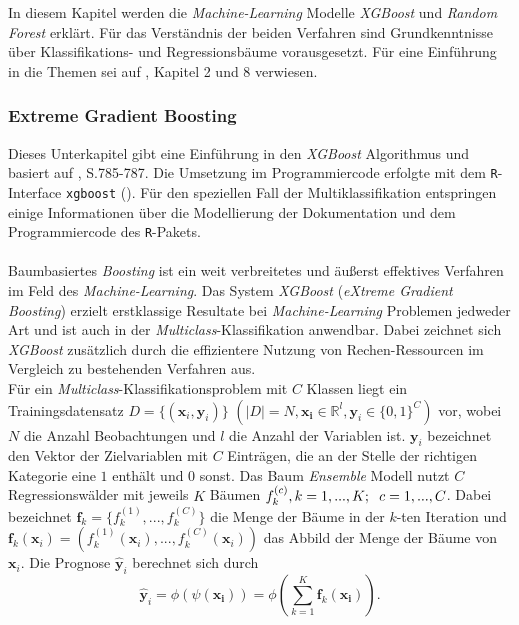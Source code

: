 \documentclass[a4paper,11pt]{article}
\begin{document}
In diesem Kapitel werden die \textit{Machine-Learning} Modelle \textit{XGBoost} und \textit{Random Forest} erklärt. Für das Verständnis der beiden Verfahren sind Grundkenntnisse über Klassifikations- und Regressionsbäume vorausgesetzt. Für eine Einführung in die Themen sei auf \cite{CART}, Kapitel 2 und 8 verwiesen.



\subsubsection{Extreme Gradient Boosting}\label{kap:XG}

Dieses Unterkapitel gibt eine Einführung in den \textit{XGBoost} Algorithmus und basiert auf \cite{XGBoost}, S.785-787. Die Umsetzung im Programmiercode erfolgte mit dem \texttt{R}-Interface \texttt{xgboost} (\cite{XGBoostR}). Für den speziellen Fall der Multiklassifikation entspringen einige Informationen über die Modellierung der Dokumentation und dem Programmiercode des \texttt{R}-Pakets.\\
\\
Baumbasiertes \textit{Boosting} ist ein weit verbreitetes und äußerst effektives Verfahren im Feld des \textit{Machine-Learning}. Das System \textit{XGBoost} (\textit{eXtreme Gradient Boosting}) erzielt erstklassige Resultate bei \textit{Machine-Learning} Problemen jedweder Art und ist auch in der \textit{Multi\-class}-Klassifikation anwendbar. Dabei zeichnet sich \textit{XGBoost} zusätzlich durch die effizientere Nutzung von Rechen-Ressourcen im Vergleich zu bestehenden Verfahren aus. \\
Für ein \textit{Multiclass}-Klassifikationsproblem mit $C$ Klassen liegt ein Trainingsdatensatz $D = \{(\bm{x}_i, \bm{y}_i) \}$ $(|D| = N, \bm{x_i} \in \mathbb{R}^l, \bm{y}_i \in \{0,1\}^C)$ vor, wobei $N$ die Anzahl Beobachtungen und $l$ die Anzahl der Variablen ist. $\bm{y}_i$ bezeichnet den Vektor der Zielvariablen mit $C$ Einträgen, die an der Stelle der richtigen Kategorie eine $1$ enthält und $0$ sonst. Das Baum \textit{Ensemble} Modell nutzt $C$ Regressionswälder mit jeweils $K$ Bäumen $f_k^{(c)}, k=1,...,K ;\hspace{0.2cm} c = 1,...,C$. Dabei bezeichnet $\bm{f}_k = \{f_k^{(1)},...,f_k^{(C)}\}$ die Menge der Bäume in der $k$-ten Iteration und $\bm{f}_k(\bm{x}_i) = (f_k^{(1)}(\bm{x}_i),...,f_k^{(C)}(\bm{x}_i))$ das Abbild der Menge der Bäume von $\bm{x}_i$. Die Prognose $\hat{\bm{y}}_i$ berechnet sich durch
\begin{equation}\label{eq:0}
    \hat{\bm{y}}_i = \phi(\psi(\bm{x_i})) = \phi( \sum_{k=1}^K \bm{f}_k(\bm{x_i})).
\end{equation}{}
\end{document}

